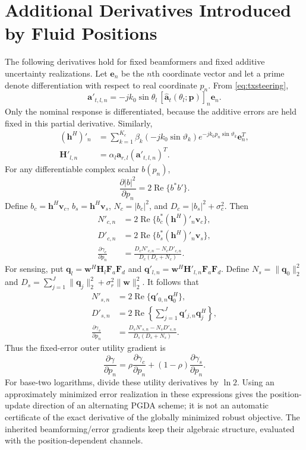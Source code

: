 \documentclass[11pt]{article}
\newcommand{\Fa}{\mathbf F_a}
\newcommand{\Fd}{\mathbf F_d}
\newcommand{\pos}{\mathbf p}
\begin{document}
\appendix
\section{Additional Derivatives Introduced by Fluid Positions}
The following derivatives hold for fixed beamformers and fixed additive
uncertainty realizations. Let $\mathbf e_n$ be the $n$th coordinate vector
and let a prime denote differentiation with respect to real coordinate $p_n$.
From \eqref{eq:txsteering},
\begin{equation}
 \mathbf a'_{t,l,n}
 =-jk_0\sin\theta_l\,
 [\widehat{\mathbf a}_t(\theta_l;\pos)]_n\mathbf e_n.
\end{equation}
Only the nominal response is differentiated, because the additive errors
are held fixed in this partial derivative. Similarly,
\begin{align}
 (\mathbf h^H)'_n
 &=\sum_{k=1}^{K_c}\beta_k(-jk_0\sin\vartheta_k)
 e^{-jk_0p_n\sin\vartheta_k}\mathbf e_n^T,\\
 \mathbf H'_{l,n}
 &=\alpha_l\mathbf a_{r,l}(\mathbf a'_{t,l,n})^T.
\end{align}
For any differentiable complex scalar $b(p_n)$,
\begin{equation}
 \frac{\partial |b|^2}{\partial p_n}
 =2\operatorname{Re}\{b^*b'\}.
\end{equation}
Define $b_c=\mathbf h^H\mathbf v_c$, $b_s=\mathbf h^H\mathbf v_s$,
$N_c=|b_c|^2$, and $D_c=|b_s|^2+\sigma_c^2$. Then
\begin{align}
 N'_{c,n}&=2\operatorname{Re}\{b_c^*(\mathbf h^H)'_n\mathbf v_c\},\\
 D'_{c,n}&=2\operatorname{Re}\{b_s^*(\mathbf h^H)'_n\mathbf v_s\},\\
 \frac{\partial\gamma_c}{\partial p_n}
 &=\frac{D_cN'_{c,n}-N_cD'_{c,n}}{D_c(D_c+N_c)}.
\end{align}
For sensing, put $\mathbf q_l=\mathbf w^H\mathbf H_l\Fa\Fd$ and
$\mathbf q'_{l,n}=\mathbf w^H\mathbf H'_{l,n}\Fa\Fd$. Define
$N_s=\|\mathbf q_0\|_2^2$ and
$D_s=\sum_{j=1}^{J}\|\mathbf q_j\|_2^2+\sigma_r^2\|\mathbf w\|_2^2$.
It follows that
\begin{align}
 N'_{s,n}&=2\operatorname{Re}\{\mathbf q'_{0,n}\mathbf q_0^H\},\\
 D'_{s,n}&=2\operatorname{Re}\left\{\sum_{j=1}^{J}
 \mathbf q'_{j,n}\mathbf q_j^H\right\},\\
 \frac{\partial\gamma_s}{\partial p_n}
 &=\frac{D_sN'_{s,n}-N_sD'_{s,n}}{D_s(D_s+N_s)}.
\end{align}
Thus the fixed-error outer utility gradient is
\begin{equation}
 \frac{\partial\gamma}{\partial p_n}
 =\rho\frac{\partial\gamma_c}{\partial p_n}
 +(1-\rho)\frac{\partial\gamma_s}{\partial p_n}.
\end{equation}
For base-two logarithms, divide these utility derivatives by $\ln 2$.
Using an approximately minimized error realization in these expressions gives
the position-update direction of an alternating PGDA scheme; it is not an
automatic certificate of the exact derivative of the globally minimized
robust objective. The inherited beamforming/error gradients keep their
algebraic structure, evaluated with the position-dependent channels.
\end{document}
